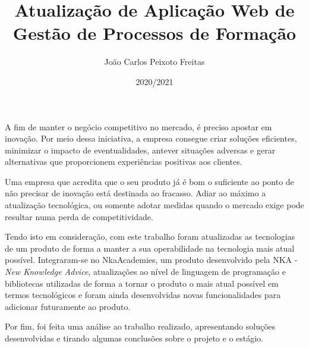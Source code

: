 \documentclass[a4paper,12pt,twoside]{book}
\title{Atualização de Aplicação Web de Gestão de Processos de Formação}
\author{João Carlos Peixoto Freitas}
\date{2020/2021}
\begin{document}
\frontmatter
\maketitle  %


\begin{resumo}

\par A fim de manter o negócio competitivo no mercado, é preciso apostar em inovação. Por meio dessa iniciativa, a empresa consegue criar soluções eficientes, minimizar o impacto de eventualidades, antever situações adversas e gerar alternativas que proporcionem experiências positivas aos clientes.
\par Uma empresa que acredita que o seu produto já é bom o suficiente ao ponto de não precisar de inovação está destinada ao fracasso. Adiar ao máximo a atualização tecnológica, ou somente adotar medidas quando o mercado exige pode resultar numa perda de competitividade.
\par Tendo isto em consideração, com este trabalho foram atualizadas as tecnologias de um produto de forma a manter a sua operabilidade na tecnologia mais atual possível. Integraram-se no NkaAcademies, um produto desenvolvido pela NKA - \textit{New Knowledge Advice}, atualizações ao nível de linguagem de programação e bibliotecas utilizadas de forma a tornar o produto o mais atual possível em termos tecnológicos e foram ainda desenvolvidas novas funcionalidades para adicionar futuramente ao produto.
\par Por fim, foi feita uma análise ao trabalho realizado, apresentando soluções desenvolvidas e tirando algumas conclusões sobre o projeto e o estágio.

\end{resumo}
\end{document}

